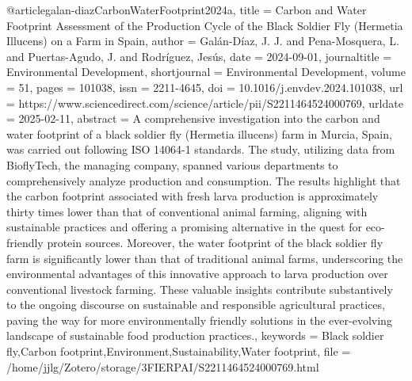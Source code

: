 {{{@article{galan-diazCarbonWaterFootprint2024a,
  title = {Carbon and Water Footprint Assessment of the Production Cycle of the Black Soldier Fly ({{Hermetia}} Illucens) on a Farm in {{Spain}}},
  author = {Galán-Díaz, J. J. and Pena-Mosquera, L. and Puertas-Agudo, J. and Rodríguez, Jesús},
  date = {2024-09-01},
  journaltitle = {Environmental Development},
  shortjournal = {Environmental Development},
  volume = {51},
  pages = {101038},
  issn = {2211-4645},
  doi = {10.1016/j.envdev.2024.101038},
  url = {https://www.sciencedirect.com/science/article/pii/S2211464524000769},
  urldate = {2025-02-11},
  abstract = {A comprehensive investigation into the carbon and water footprint of a black soldier fly (Hermetia illucens) farm in Murcia, Spain, was carried out following ISO 14064-1 standards. The study, utilizing data from BioflyTech, the managing company, spanned various departments to comprehensively analyze production and consumption. The results highlight that the carbon footprint associated with fresh larva production is approximately thirty times lower than that of conventional animal farming, aligning with sustainable practices and offering a promising alternative in the quest for eco-friendly protein sources. Moreover, the water footprint of the black soldier fly farm is significantly lower than that of traditional animal farms, underscoring the environmental advantages of this innovative approach to larva production over conventional livestock farming. These valuable insights contribute substantively to the ongoing discourse on sustainable and responsible agricultural practices, paving the way for more environmentally friendly solutions in the ever-evolving landscape of sustainable food production practices.},
  keywords = {Black soldier fly,Carbon footprint,Environment,Sustainability,Water footprint},
  file = {/home/jjlg/Zotero/storage/3FIERPAI/S2211464524000769.html}
}

}}}
